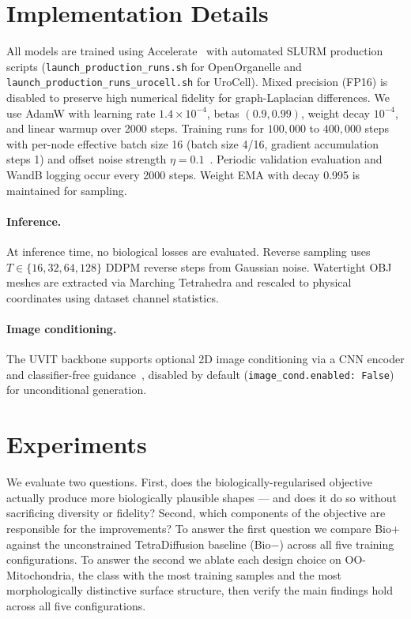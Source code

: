 \documentclass[10pt, a4paper, twocolumn]{article}
\begin{document}
\section{Implementation Details}
\label{sec:impl}

All models are trained using Accelerate~\cite{sylvain2022accelerate} with automated SLURM production scripts (\texttt{launch\_production\_runs.sh} for OpenOrganelle and \texttt{launch\_production\_runs\_urocell.sh} for UroCell). Mixed precision (FP16) is disabled to preserve high numerical fidelity for graph-Laplacian differences. We use AdamW with learning rate $1.4 \times 10^{-4}$, betas $(0.9, 0.99)$, weight decay $10^{-4}$, and linear warmup over 2000 steps. Training runs for $100{,}000$ to $400{,}000$ steps with per-node effective batch size 16 (batch size 4/16, gradient accumulation steps 1) and offset noise strength $\eta=0.1$~\cite{lin2024common}. Periodic validation evaluation and WandB logging occur every 2000 steps. Weight EMA with decay 0.995 is maintained for sampling.

\paragraph{Inference.} At inference time, no biological losses are evaluated. Reverse sampling uses $T \in \{16, 32, 64, 128\}$ DDPM reverse steps from Gaussian noise. Watertight OBJ meshes are extracted via Marching Tetrahedra and rescaled to physical coordinates using dataset channel statistics.

\paragraph{Image conditioning.} The UVIT backbone supports optional 2D image conditioning via a CNN encoder and classifier-free guidance~\cite{dhariwal2021diffusion}, disabled by default (\texttt{image\_cond.enabled: False}) for unconditional generation.

\section{Experiments}
\label{sec:experiments}

We evaluate two questions. First, does the biologically-regularised objective actually produce more biologically plausible shapes — and does it do so without sacrificing diversity or fidelity? Second, which components of the objective are responsible for the improvements? To answer the first question we compare Bio$+$ against the unconstrained TetraDiffusion baseline (Bio$-$) across all five training configurations. To answer the second we ablate each design choice on OO-Mitochondria, the class with the most training samples and the most morphologically distinctive surface structure, then verify the main findings hold across all five configurations.
\end{document}
